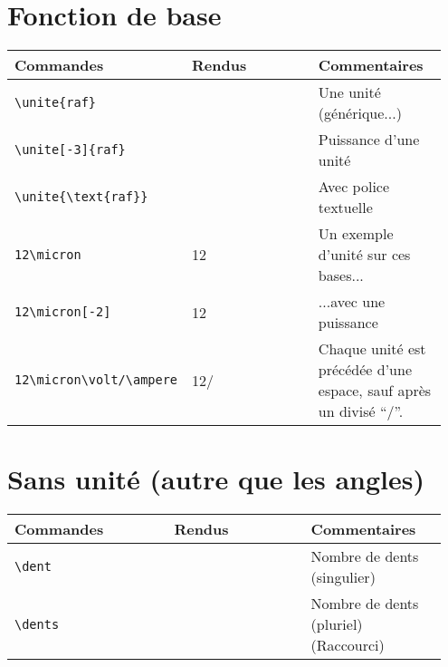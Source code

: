 \documentclass[a4paper,12pt]{article}
\newcommand{\rac}{({\color{red}Raccourci})}
\begin{document}
	\section{Fonction de base}
	\noindent
	\begin{tabular}{|p{0.35\linewidth}|p{0.3\linewidth}|p{0.3\linewidth}|}
		\hline
			\textbf{Commandes}&\textbf{Rendus}&\textbf{Commentaires}
		\\\hline\hline
			\verb!\unite{raf}!			&	\unite{raf}			&	Une unité (générique...)
		\\\hline
			\verb!\unite[-3]{raf}!			&	\unite[-3]{raf}		&	Puissance d'une unité
		\\\hline
			\verb!\unite{\text{raf}}!		&	\unite{\text{raf}}		&	Avec police textuelle
		\\\hline
			\verb!12\micron!		&	12\micron		&	Un exemple d'unité sur ces bases...
		\\\hline
			\verb!12\micron[-2]!		&	12\micron[-2]		&	...avec une puissance
		\\\hline
			\verb!12\micron\volt/\ampere!	&	12\micron\volt/\ampere	&	Chaque unité est précédée d'une espace, sauf après un divisé ``$/$''.
		\\\hline
	\end{tabular}


	
	\section{Sans unité (autre que les angles)}
	\noindent
	\begin{tabular}{|p{0.35\linewidth}|p{0.3\linewidth}|p{0.3\linewidth}|}
		\hline
 			\textbf{Commandes}&\textbf{Rendus}&\textbf{Commentaires}
 		\\\hline\hline
 			\verb!\dent!	& 	\dent	& Nombre de dents (singulier)	\\
 		\hline
			\verb!\dents!		& 	\dents	&Nombre de dents (pluriel)	\rac\\
		\hline
	\end{tabular}
	
\end{document}
